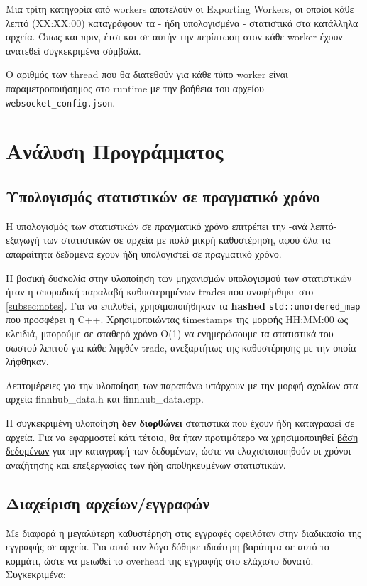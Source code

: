 \documentclass[12pt]{article}
\begin{document}
Μια τρίτη κατηγορία από workers αποτελούν οι Exporting Workers, οι οποίοι κάθε λεπτό (XX:XX:00) καταγράφουν τα - ήδη υπολογισμένα - στατιστικά στα κατάλληλα αρχεία. Όπως και πριν, έτσι και σε αυτήν την περίπτωση στον κάθε worker έχουν ανατεθεί συγκεκριμένα σύμβολα.

Ο αριθμός των thread που θα διατεθούν για κάθε τύπο worker είναι παραμετροποιήσημος στο runtime με την βοήθεια του αρχείου \texttt{websocket\_config.json}.

\section{Ανάλυση Προγράμματος}
\subsection{Υπολογισμός στατιστικών σε πραγματικό χρόνο}
Η υπολογισμός των στατιστικών σε πραγματικό χρόνο επιτρέπει την -ανά λεπτό- εξαγωγή των στατιστικών σε αρχεία με πολύ μικρή καθυστέρηση, αφού όλα τα απαραίτητα δεδομένα έχουν ήδη υπολογιστεί σε πραγματικό χρόνο.

Η βασική δυσκολία στην υλοποίηση των μηχανισμών υπολογισμού των στατιστικών ήταν η σποραδική παραλαβή καθυστερημένων trades που αναφέρθηκε στο \ref{subsec:notes}. Για να επιλυθεί, χρησιμοποιήθηκαν τα \textbf{hashed} \texttt{std::unordered\_map} που προσφέρει η C++. Χρησιμοποιώντας timestamps της μορφής HH:MM:00 ως κλειδιά, μπορούμε σε σταθερό χρόνο O(1) να ενημερώσουμε τα στατιστικά του σωστού λεπτού για κάθε ληφθέν trade, ανεξαρτήτως της καθυστέρησης με την οποία λήφθηκαν.

Λεπτομέρειες για την υλοποίηση των παραπάνω υπάρχουν με την μορφή σχολίων στα αρχεία finnhub\_data.h και finnhub\_data.cpp.

Η συγκεκριμένη υλοποίηση \textbf{δεν διορθώνει} στατιστικά που έχουν ήδη καταγραφεί σε αρχεία. Για να εφαρμοστεί κάτι τέτοιο, θα ήταν προτιμότερο να χρησιμοποιηθεί \href{https://www.sqlite.org/}{βάση δεδομένων} για την καταγραφή των δεδομένων, ώστε να ελαχιστοποιηθούν οι χρόνοι αναζήτησης και επεξεργασίας των ήδη αποθηκευμένων στατιστικών.

\subsection{Διαχείριση αρχείων/εγγραφών}

Με διαφορά η μεγαλύτερη καθυστέρηση στις εγγραφές οφειλόταν στην διαδικασία της εγγραφής σε αρχεία. Για αυτό τον λόγο δόθηκε ιδιαίτερη βαρύτητα σε αυτό το κομμάτι, ώστε να μειωθεί το overhead της εγγραφής στο ελάχιστο δυνατό. Συγκεκριμένα:
\end{document}
